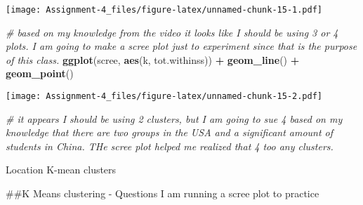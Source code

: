 \documentclass[
]{article}
\newenvironment{Shaded}{\begin{snugshade}}{\end{snugshade}}
\newcommand{\CommentTok}[1]{\textcolor[rgb]{0.56,0.35,0.01}{\textit{#1}}}
\newcommand{\DataTypeTok}[1]{\textcolor[rgb]{0.13,0.29,0.53}{#1}}
\newcommand{\DecValTok}[1]{\textcolor[rgb]{0.00,0.00,0.81}{#1}}
\newcommand{\KeywordTok}[1]{\textcolor[rgb]{0.13,0.29,0.53}{\textbf{#1}}}
\newcommand{\NormalTok}[1]{#1}
\newcommand{\OperatorTok}[1]{\textcolor[rgb]{0.81,0.36,0.00}{\textbf{#1}}}
\newcommand{\StringTok}[1]{\textcolor[rgb]{0.31,0.60,0.02}{#1}}
\begin{document}
\texttt{[image: Assignment-4\_files/figure-latex/unnamed-chunk-15-1.pdf]}

\begin{Shaded}
\begin{Highlighting}[]
\CommentTok{# based on my knowledge from the video it looks like I should be using 3 or 4 plots. I am going to make a scree plot just to experiment since that is the purpose of this class.}
\KeywordTok{ggplot}\NormalTok{(scree, }\KeywordTok{aes}\NormalTok{(k, tot.withinss)) }\OperatorTok{+}
\StringTok{  }\KeywordTok{geom_line}\NormalTok{() }\OperatorTok{+}
\StringTok{  }\KeywordTok{geom_point}\NormalTok{()}
\end{Highlighting}
\end{Shaded}

\texttt{[image: Assignment-4\_files/figure-latex/unnamed-chunk-15-2.pdf]}

\begin{Shaded}
\begin{Highlighting}[]
\CommentTok{# it appears I should be using 2 clusters, but I am going to sue 4 based on my knowledge that there are two groups in the USA and a significant amount of students in China. THe scree plot helped me realized that 4 too any clusters.}
\end{Highlighting}
\end{Shaded}

Location K-mean clusters

\begin{Shaded}
\end{Shaded}

\#\#K Means clustering - Questions I am running a scree plot to practice
\end{document}
